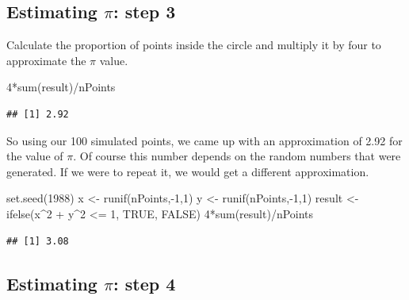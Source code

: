 \documentclass[
]{book}
\newenvironment{Shaded}{\begin{snugshade}}{\end{snugshade}}
\newcommand{\ConstantTok}[1]{\textcolor[rgb]{0.00,0.00,0.00}{#1}}
\newcommand{\DecValTok}[1]{\textcolor[rgb]{0.00,0.00,0.81}{#1}}
\newcommand{\FunctionTok}[1]{\textcolor[rgb]{0.00,0.00,0.00}{#1}}
\newcommand{\NormalTok}[1]{#1}
\newcommand{\OtherTok}[1]{\textcolor[rgb]{0.56,0.35,0.01}{#1}}
\newcommand{\SpecialCharTok}[1]{\textcolor[rgb]{0.00,0.00,0.00}{#1}}
\theoremstyle{definition}
\theoremstyle{definition}
\theoremstyle{definition}
\theoremstyle{definition}
\theoremstyle{remark}
\begin{document}
\hypertarget{estimating-pi-step-3}{%
\subsection{\texorpdfstring{Estimating \(\pi\): step 3}{Estimating \textbackslash pi: step 3}}\label{estimating-pi-step-3}}

Calculate the proportion of points inside the circle and multiply it by four to approximate the \(\pi\) value.

\begin{Shaded}
\begin{Highlighting}[]
\DecValTok{4}\SpecialCharTok{*}\FunctionTok{sum}\NormalTok{(result)}\SpecialCharTok{/}\NormalTok{nPoints}
\end{Highlighting}
\end{Shaded}

\begin{verbatim}
## [1] 2.92
\end{verbatim}

So using our 100 simulated points, we came up with an approximation of 2.92 for the value of \(\pi\). Of course this number depends on the random numbers that were generated. If we were to repeat it, we would get a different approximation.

\begin{Shaded}
\begin{Highlighting}[]
\FunctionTok{set.seed}\NormalTok{(}\DecValTok{1988}\NormalTok{)}
\NormalTok{x }\OtherTok{\textless{}{-}} \FunctionTok{runif}\NormalTok{(nPoints,}\SpecialCharTok{{-}}\DecValTok{1}\NormalTok{,}\DecValTok{1}\NormalTok{)}
\NormalTok{y }\OtherTok{\textless{}{-}} \FunctionTok{runif}\NormalTok{(nPoints,}\SpecialCharTok{{-}}\DecValTok{1}\NormalTok{,}\DecValTok{1}\NormalTok{)}
\NormalTok{result }\OtherTok{\textless{}{-}} \FunctionTok{ifelse}\NormalTok{(x}\SpecialCharTok{\^{}}\DecValTok{2} \SpecialCharTok{+}\NormalTok{ y}\SpecialCharTok{\^{}}\DecValTok{2} \SpecialCharTok{\textless{}=} \DecValTok{1}\NormalTok{, }\ConstantTok{TRUE}\NormalTok{, }\ConstantTok{FALSE}\NormalTok{)}
\DecValTok{4}\SpecialCharTok{*}\FunctionTok{sum}\NormalTok{(result)}\SpecialCharTok{/}\NormalTok{nPoints}
\end{Highlighting}
\end{Shaded}

\begin{verbatim}
## [1] 3.08
\end{verbatim}

\hypertarget{estimating-pi-step-4}{%
\subsection{\texorpdfstring{Estimating \(\pi\): step 4}{Estimating \textbackslash pi: step 4}}\label{estimating-pi-step-4}}
\end{document}
